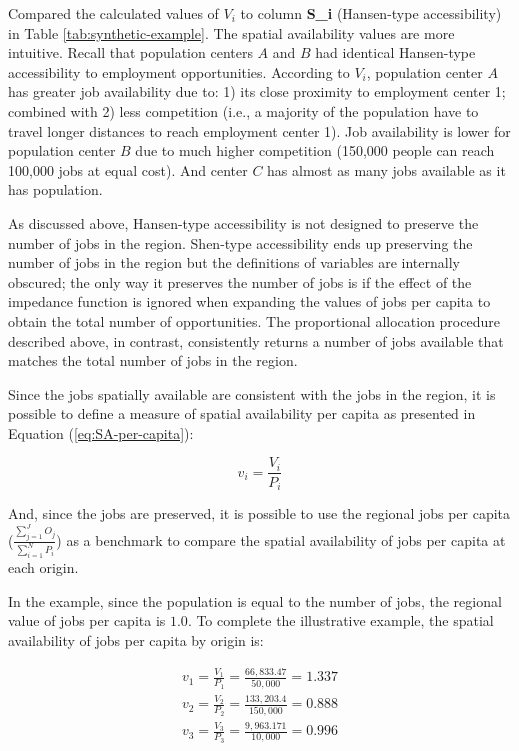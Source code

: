 \documentclass[10pt,letterpaper]{article}
\begin{document}
Compared the calculated values of \(V_i\) to column \textbf{S\_i}
(Hansen-type accessibility) in Table \ref{tab:synthetic-example}. The
spatial availability values are more intuitive. Recall that population
centers \(A\) and \(B\) had identical Hansen-type accessibility to
employment opportunities. According to \(V_i\), population center \(A\)
has greater job availability due to: 1) its close proximity to
employment center 1; combined with 2) less competition (i.e., a majority
of the population have to travel longer distances to reach employment
center 1). Job availability is lower for population center \(B\) due to
much higher competition (150,000 people can reach 100,000 jobs at equal
cost). And center \(C\) has almost as many jobs available as it has
population.

As discussed above, Hansen-type accessibility is not designed to
preserve the number of jobs in the region. Shen-type accessibility ends
up preserving the number of jobs in the region but the definitions of
variables are internally obscured; the only way it preserves the number
of jobs is if the effect of the impedance function is ignored when
expanding the values of jobs per capita to obtain the total number of
opportunities. The proportional allocation procedure described above, in
contrast, consistently returns a number of jobs available that matches
the total number of jobs in the region.

Since the jobs spatially available are consistent with the jobs in the
region, it is possible to define a measure of spatial availability per
capita as presented in Equation (\ref{eq:SA-per-capita}):

\begin{equation}
\label{eq:SA-per-capita}
v_i = \frac{V_i}{P_i}
\end{equation}

And, since the jobs are preserved, it is possible to use the regional
jobs per capita (\(\frac{\sum_{j=1}^J O_j}{\sum_{i=1}^N P_i}\)) as a
benchmark to compare the spatial availability of jobs per capita at each
origin.

In the example, since the population is equal to the number of jobs, the
regional value of jobs per capita is \(1.0\). To complete the
illustrative example, the spatial availability of jobs per capita by
origin is:

\begin{equation}
\label{eq:SA-per-capita-2populations}
\begin{array}{l}
v_{1} = \frac{V_1}{P_1} =  \frac{66,833.47}{50,000} = 1.337\\
v_{2} =  \frac{V_{2}}{P_2} =  \frac{133,203.4}{150,000} = 0.888\\
v_{3} =  \frac{V_{3}}{P_3} =  \frac{9,963.171}{10,000} = 0.996\\
\end{array}
\end{equation}
\end{document}
